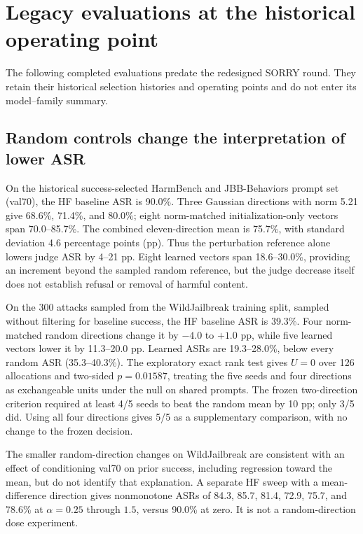 \section{Legacy evaluations at the historical operating point}
\label{app:legacy-results}
The following completed evaluations predate the redesigned SORRY round. They retain their historical selection histories and operating points and do not enter its model--family summary.

\subsection{Random controls change the interpretation of lower ASR}

On the historical success-selected HarmBench and JBB-Behaviors prompt set (val70), the HF baseline ASR is 90.0\%. Three Gaussian directions with norm 5.21 give 68.6\%, 71.4\%, and 80.0\%; eight norm-matched initialization-only vectors span 70.0--85.7\%. The combined eleven-direction mean is 75.7\%, with standard deviation 4.6 percentage points (pp). Thus the perturbation reference alone lowers judge ASR by 4--21 pp. Eight learned vectors span 18.6--30.0\%, providing an increment beyond the sampled random reference, but the judge decrease itself does not establish refusal or removal of harmful content.


On the 300 attacks sampled from the WildJailbreak training split, sampled without filtering for baseline success, the HF baseline ASR is 39.3\%. Four norm-matched random directions change it by $-4.0$ to $+1.0$ pp, while five learned vectors lower it by 11.3--20.0 pp. Learned ASRs are 19.3--28.0\%, below every random ASR (35.3--40.3\%). The exploratory exact rank test gives $U=0$ over 126 allocations and two-sided $p=0.01587$, treating the five seeds and four directions as exchangeable units under the null on shared prompts. The frozen two-direction criterion required at least 4/5 seeds to beat the random mean by 10 pp; only 3/5 did. Using all four directions gives 5/5 as a supplementary comparison, with no change to the frozen decision.

The smaller random-direction changes on WildJailbreak are consistent with an effect of conditioning val70 on prior success, including regression toward the mean, but do not identify that explanation. A separate HF sweep with a mean-difference direction gives nonmonotone ASRs of 84.3, 85.7, 81.4, 72.9, 75.7, and 78.6\% at $\alpha=0.25$ through $1.5$, versus 90.0\% at zero. It is not a random-direction dose experiment.


